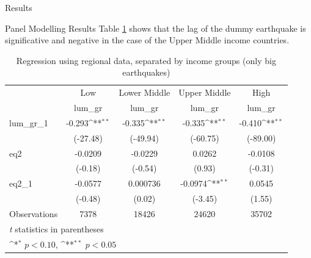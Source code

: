 \documentclass[12.5pt,fleqn,leqno,letterpaper]{article}
\begin{document}
\begin{section}{Results}
\begin{subsection}{Panel Modelling Results}
    Table \ref{tab5} shows that the lag of the dummy earthquake is significative and negative in the case of the Upper Middle income countries. 

    \begin{table}[H]\centering
      \def\sym#1{\ifmmode^{#1}\else\(^{#1}\)\fi}
      \caption{Regression using regional data, separated by income groups (only big earthquakes)\label{tab5}}
      \begin{tabular}{l*{4}{c}}
        \hline\hline
        &\multicolumn{1}{c}{Low}&\multicolumn{1}{c}{Lower Middle}&\multicolumn{1}{c}{Upper Middle}&\multicolumn{1}{c}{High}\\
        &\multicolumn{1}{c}{lum\_gr}&\multicolumn{1}{c}{lum\_gr}&\multicolumn{1}{c}{lum\_gr}&\multicolumn{1}{c}{lum\_gr}\\
        \hline
        lum\_gr\_1            &      -0.293\sym{**}&      -0.335\sym{**}&      -0.335\sym{**}&      -0.410\sym{**}\\
                              &    (-27.48)        &    (-49.94)        &    (-60.75)        &    (-89.00)        \\
        [1em]
        eq2                 &     -0.0209        &     -0.0229        &      0.0262        &     -0.0108        \\
                            &     (-0.18)        &     (-0.54)        &      (0.93)        &     (-0.31)        \\
        [1em]
        eq2\_1               &     -0.0577        &    0.000736        &     -0.0974\sym{**}&      0.0545        \\
                             &     (-0.48)        &      (0.02)        &     (-3.45)        &      (1.55)        \\
        \hline
        Observations        &        7378        &       18426        &       24620        &       35702        \\
        \hline\hline
        \multicolumn{5}{l}{\footnotesize \textit{t} statistics in parentheses}\\
        \multicolumn{5}{l}{\footnotesize \sym{*} \(p<0.10\), \sym{**} \(p<0.05\)}\\
      \end{tabular}
    \end{table}



\end{subsection}
\end{section}
\end{document}
